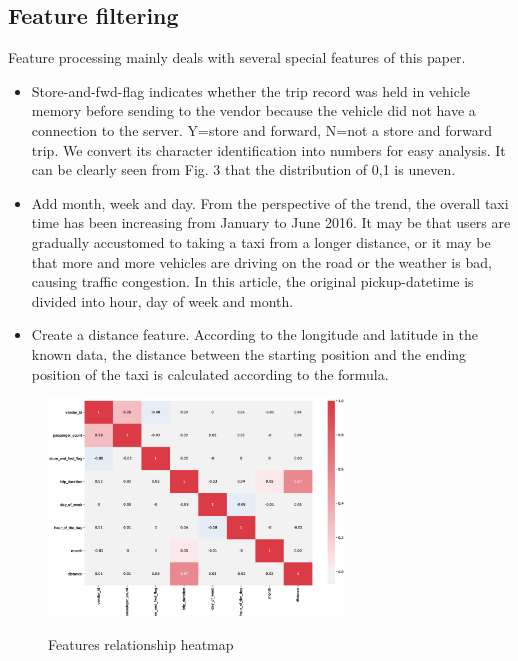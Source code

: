 \documentclass{amsart}
\begin{document}
\subsection{Feature filtering}
Feature processing mainly deals with several special features of this paper.
\begin{itemize}
    \item  
   Store-and-fwd-flag indicates whether the trip record was held in vehicle memory before sending to the vendor because the vehicle did not have a connection to the server. Y=store and forward, N=not a store and forward trip. We convert its character identification into numbers for easy analysis. It can be clearly seen from Fig. 3 that the distribution of 0,1 is uneven.
    \item 
   Add month, week and day. From the perspective of the trend, the overall taxi time has been increasing from January to June 2016. It may be that users are gradually accustomed to taking a taxi from a longer distance, or it may be that more and more vehicles are driving on the road or the weather is bad, causing traffic congestion. In this article, the original pickup-datetime is divided into hour, day of week and month.
    \item 
   Create a distance feature. According to the longitude and latitude in the known data, the distance between the starting position and the ending position of the taxi is calculated according to the formula.
   \end{itemize}



\begin{figure}
  \centering
   \includegraphics[width=0.7\textwidth]{figure//fig-6.eps}\\
  \caption{Features relationship heatmap}\label{fig:demical}
\end{figure}
\end{document}
